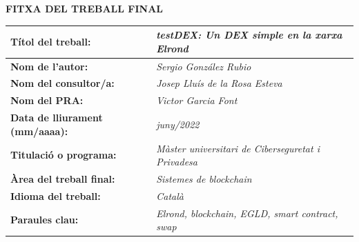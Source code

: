\documentclass[11pt,a4paper]{article}
\begin{document}
\begin{center}
\textbf{FITXA DEL TREBALL FINAL}
\end{center}
\begin{tabularx}{\textwidth}{|X|X|}
\hline 
\textbf{Títol del treball:} &\cellcolor{gray!25} \textit{testDEX: Un DEX simple en la xarxa Elrond} \\ 
\hline 
\textbf{Nom de l'autor:} &\cellcolor{gray!25} \textit{Sergio González Rubio} \\ 
\hline 
\textbf{Nom del consultor/a:} &\cellcolor{gray!25} \textit{Josep Lluís de la Rosa Esteva} \\ 
\hline 
\textbf{Nom del PRA:} &\cellcolor{gray!25} \textit{Victor Garcia Font} \\ 
\hline 
\textbf{Data de lliurament (mm/aaaa):} &\cellcolor{gray!25} \textit{juny/2022} \\ 
\hline 
\textbf{Titulació o programa:} &\cellcolor{gray!25} \textit{Màster universitari de Ciberseguretat i Privadesa} \\ 
\hline 
\textbf{Àrea del treball final:} &\cellcolor{gray!25} \textit{Sistemes de blockchain} \\ 
\hline 
\textbf{Idioma del treball:} &\cellcolor{gray!25} \textit{Català} \\ 
\hline 
\textbf{Paraules clau:} &\cellcolor{gray!25} \textit{Elrond, blockchain, EGLD, smart contract, swap} \\ 
\hline
\end{tabularx} 
\end{document}
